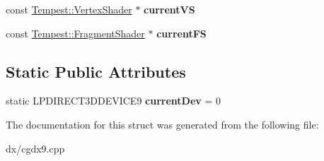 \begin{DoxyCompactItemize}
\item 
\hypertarget{struct_cg_dx9_1_1_data_aa5101dd8c51fa1d8c6852d1a0bf60d60}{const \hyperlink{class_tempest_1_1_vertex_shader}{Tempest\+::\+Vertex\+Shader} $\ast$ {\bfseries current\+V\+S}}\label{struct_cg_dx9_1_1_data_aa5101dd8c51fa1d8c6852d1a0bf60d60}

\item 
\hypertarget{struct_cg_dx9_1_1_data_a0a9606e28c9f89ef508ff3c58a1a9645}{const \hyperlink{class_tempest_1_1_fragment_shader}{Tempest\+::\+Fragment\+Shader} $\ast$ {\bfseries current\+F\+S}}\label{struct_cg_dx9_1_1_data_a0a9606e28c9f89ef508ff3c58a1a9645}

\end{DoxyCompactItemize}
\subsection*{Static Public Attributes}
\begin{DoxyCompactItemize}
\item 
\hypertarget{struct_cg_dx9_1_1_data_a81337d8137e542c4a4122d1605ac5952}{static L\+P\+D\+I\+R\+E\+C\+T3\+D\+D\+E\+V\+I\+C\+E9 {\bfseries current\+Dev} = 0}\label{struct_cg_dx9_1_1_data_a81337d8137e542c4a4122d1605ac5952}

\end{DoxyCompactItemize}


The documentation for this struct was generated from the following file\+:\begin{DoxyCompactItemize}
\item 
dx/cgdx9.\+cpp\end{DoxyCompactItemize}
